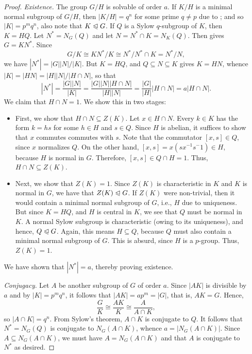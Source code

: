 \begin{proof}
    \noindent\emph{Existence.} The group $G/H$ is solvable of order $a$. If $K/H$ is a minimal normal subgroup of $G/H$, then $|K/H| = q^n$ for some prime $q\ne p$ due to ; and so $|K| = p^mq^n$, also note that $K\trianglelefteqslant G$. If $Q$ is a Sylow $q$-subgroup of $K$, then $K = HQ$. Let $N^\ast = N_G(Q)$ and let $N = N^\ast\cap K = N_K(Q)$. Then  gives $G = KN^\ast$. Since 
    \begin{equation*}
        G/K\cong KN^\ast/K\cong N^\ast/N^\ast\cap K = N^\ast/N,
    \end{equation*}
    we have $|N^\ast| = |G||N|/|K|$. But $K = HQ$, and $Q\subseteq N\subseteq K$ gives $K = HN$, whence $|K| = |HN| = |H||N|/|H\cap N|$, so that 
    \begin{equation*}
        |N^\ast| = \frac{|G||N|}{|K|} = \frac{|G||N||H\cap N|}{|H||N|} = \frac{|G|}{|H|}|H\cap N| = a|H\cap N|.
    \end{equation*}
    We claim that $H\cap N = 1$. We show this in two stages: 
    \begin{itemize}
        \item First, we show that $H\cap N\subseteq Z(K)$. Let $x\in H\cap N$. Every $k\in K$ has the form $k = hs$ for some $h\in H$ and $s\in Q$. Since $H$ is abelian, it suffices to show that $x$ commutes commutes with $s$. Note that the commutator $[x, s]\in Q$, since $x$ normalizes $Q$. On the other hand, $[x, s] = x(sx^{-1}s{^-1})\in H$, because $H$ is normal in $G$. Therefore, $[x, s]\in Q\cap H = 1$. Thus, $H\cap N\subseteq Z(K)$.
        \item Next, we show that $Z(K) = 1$. Since $Z(K)$ is characteristic in $K$ and $K$ is normal in $G$, we have that $Z(K)\trianglelefteqslant G$. If $Z(K)$ were non-trivial, then it would contain a minimal normal subgroup of $G$, i.e., $H$ due to uniqueness. But since $K = HQ$, and $H$ is central in $K$, we see that $Q$ must be normal in $K$. A normal Sylow subgroup is characteristic (owing to its uniqueness), and hence, $Q\trianglelefteqslant G$. Again, this means $H\subseteq Q$, because $Q$ must also contain a minimal normal subgroup of $G$. This is absurd, since $H$ is a $p$-group. Thus, $Z(K) = 1$.
    \end{itemize}
    We have shown that $|N^\ast| = a$, thereby proving existence. 

    \noindent\emph{Conjugacy.} Let $A$ be another subgroup of $G$ of order $a$. Since $|AK|$ is divisible by $a$ and by $|K| = p^mq^n$, it follows that $|AK| = ap^m = |G|$, that is, $AK = G$. Hence, 
    \begin{equation*}
        \frac{G}{K}\cong\frac{AK}{K}\cong\frac{A}{A\cap K},
    \end{equation*}
    so $|A\cap K| = q^n$. From Sylow's theorem, $A\cap K$ is conjugate to $Q$. It follows that $N^\ast = N_G(Q)$ is conjugate to $N_G(A\cap K)$, whence $a = |N_G(A\cap K)|$. Since $A\subseteq N_G(A\cap K)$, we must have $A = N_G(A\cap K)$ and that $A$ is conjugate to $N^\ast$ as desired.
\end{proof}